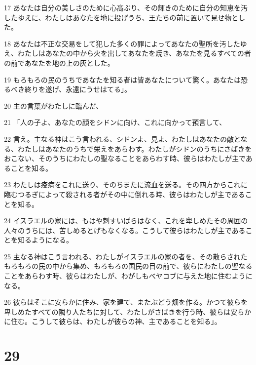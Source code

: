\par 17 あなたは自分の美しさのために心高ぶり、その輝きのために自分の知恵を汚したゆえに、わたしはあなたを地に投げうち、王たちの前に置いて見せ物とした。
\par 18 あなたは不正な交易をして犯した多くの罪によってあなたの聖所を汚したゆえ、わたしはあなたの中から火を出してあなたを焼き、あなたを見るすべての者の前であなたを地の上の灰とした。
\par 19 もろもろの民のうちであなたを知る者は皆あなたについて驚く。あなたは恐るべき終りを遂げ、永遠にうせはてる」。
\par 20 主の言葉がわたしに臨んだ、
\par 21 「人の子よ、あなたの顔をシドンに向け、これに向かって預言して、
\par 22 言え。主なる神はこう言われる、シドンよ、見よ、わたしはあなたの敵となる、わたしはあなたのうちで栄えをあらわす。わたしがシドンのうちにさばきをおこない、そのうちにわたしの聖なることをあらわす時、彼らはわたしが主であることを知る。
\par 23 わたしは疫病をこれに送り、そのちまたに流血を送る。その四方からこれに臨むつるぎによって殺される者がその中に倒れる時、彼らはわたしが主であることを知る。
\par 24 イスラエルの家には、もはや刺すいばらはなく、これを卑しめたその周囲の人々のうちには、苦しめるとげもなくなる。こうして彼らはわたしが主であることを知るようになる。
\par 25 主なる神はこう言われる、わたしがイスラエルの家の者を、その散らされたもろもろの民の中から集め、もろもろの国民の目の前で、彼らにわたしの聖なることをあらわす時、彼らはわたしが、わがしもべヤコブに与えた地に住むようになる。
\par 26 彼らはそこに安らかに住み、家を建て、またぶどう畑を作る。かつて彼らを卑しめたすべての隣り人たちに対して、わたしがさばきを行う時、彼らは安らかに住む。こうして彼らは、わたしが彼らの神、主であることを知る」。

\chapter{29}

